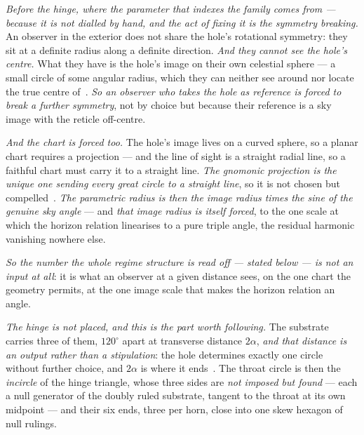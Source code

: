 \documentclass[11pt,a4paper]{article}
\theoremstyle{plain}
\theoremstyle{definition}
\begin{document}
\emph{Before the hinge, where the parameter that indexes the family comes from --- because it is not dialled
by hand, and the act of fixing it \emph{is} the symmetry breaking.} An observer in the exterior does not share
the hole's rotational symmetry: they sit at a definite radius along a definite direction. \emph{And they
cannot see the hole's centre.} What they have is the hole's image on their own celestial sphere --- a small
circle of some angular radius, which they can neither see around nor locate the true centre
of~\cite{JanzenSlicing}. \emph{So an observer who takes the hole as reference is forced to break a further
symmetry}, not by choice but because their reference is a sky image with the reticle off-centre.

\emph{And the chart is forced too.} The hole's image lives on a curved sphere, so a planar chart requires a
projection --- and the line of sight is a straight radial line, so a faithful chart must carry it to a
straight line. \emph{The gnomonic projection is the unique one sending every great circle to a straight
line}, so it is not chosen but compelled~\cite{JanzenSlicing}. \emph{The parametric radius is then the image
radius times the sine of the genuine sky angle} --- and \emph{that image radius is itself forced}, to the one
scale at which the horizon relation linearises to a pure triple angle, the residual harmonic vanishing
nowhere else.

\emph{So the number the whole regime structure is read off --- stated below --- is not an input at all}: it
is what an observer at a given distance sees, on the one chart the geometry permits, at the one image scale
that makes the horizon relation an angle.

\emph{The hinge is not placed, and this is the part worth following.} The substrate carries three of them,
$120^{\circ}$ apart at transverse distance $2\alpha$, \emph{and that distance is an output rather than a
stipulation}: the hole determines exactly one circle without further choice, and $2\alpha$ is where it
ends~\cite{JanzenSlicing}. The throat circle is then the \emph{incircle} of the hinge triangle, whose three
sides are \emph{not imposed but found} --- each a null generator of the doubly ruled substrate, tangent to
the throat at its own midpoint --- and their six ends, three per horn, close into one skew hexagon of null
rulings.
\end{document}
